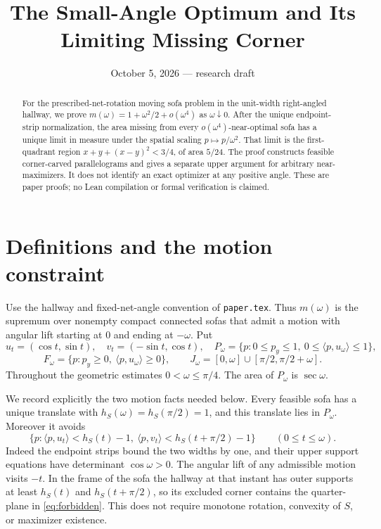 \documentclass[11pt]{article}
\title{The Small-Angle Optimum and Its Limiting Missing Corner}
\author{}
\date{October 5, 2026 --- research draft}
\theoremstyle{remark}\newtheorem{remark}[theorem]{Remark}
\newcommand{\ip}[2]{\langle #1,#2\rangle}
\begin{document}
\maketitle
\begin{abstract}
For the prescribed-net-rotation moving sofa problem in the unit-width right-angled hallway, we prove $m(\omega)=1+\omega^2/2+o(\omega^4)$ as $\omega\downarrow0$. After the unique endpoint-strip normalization, the area missing from every $o(\omega^4)$-near-optimal sofa has a unique limit in measure under the spatial scaling $p\mapsto p/\omega^2$. That limit is the first-quadrant region $x+y+(x-y)^2<3/4$, of area $5/24$. The proof constructs feasible corner-carved parallelograms and gives a separate upper argument for arbitrary near-maximizers. It does not identify an exact optimizer at any positive angle. These are paper proofs; no Lean compilation or formal verification is claimed.
\end{abstract}

\section{Definitions and the motion constraint}
Use the hallway and fixed-net-angle convention of \texttt{paper.tex}. Thus $m(\omega)$ is the supremum over nonempty compact connected sofas that admit a motion with angular lift starting at $0$ and ending at $-\omega$. Put
\[
 u_t=(\cos t,\sin t),\quad v_t=(-\sin t,\cos t),\quad
 P_\omega=\{p:0\le p_y\le1,\ 0\le\ip p{u_\omega}\le1\},
\]
\[
 F_\omega=\{p:p_y\ge0,\ \ip p{u_\omega}\ge0\},\qquad
 J_\omega=[0,\omega]\cup[\pi/2,\pi/2+\omega].
\]
Throughout the geometric estimates $0<\omega\le\pi/4$. The area of $P_\omega$ is $\sec\omega$.

We record explicitly the two motion facts needed below. Every feasible sofa has a unique translate with $h_S(\omega)=h_S(\pi/2)=1$, and this translate lies in $P_\omega$. Moreover it avoids
\begin{equation}\label{eq:forbidden}
 \{p:\ip p{u_t}<h_S(t)-1,\ \ip p{v_t}<h_S(t+\pi/2)-1\}
 \qquad(0\le t\le\omega).
\end{equation}
Indeed the endpoint strips bound the two widths by one, and their upper support equations have determinant $\cos\omega>0$. The angular lift of any admissible motion visits $-t$. In the frame of the sofa the hallway at that instant has outer supports at least $h_S(t)$ and $h_S(t+\pi/2)$, so its excluded corner contains the quarter-plane in \eqref{eq:forbidden}. This does not require monotone rotation, convexity of $S$, or maximizer existence.
\end{document}
